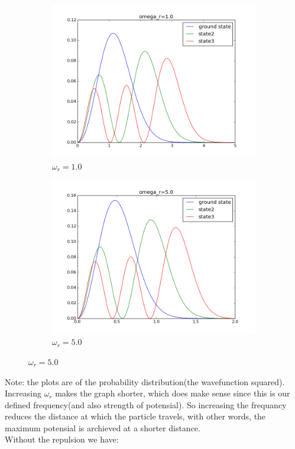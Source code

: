 \documentclass[11pt, a4 paper]{report}
\newenvironment{tabbed}{\begin{addmargin}{0.1cm}}{\end{addmargin}}
\newcommand{\vsp}{\vspace{0.2cm}}
\begin{document}
    \begin{figure}[H] 
        \captionsetup[subfigure]{labelformat=empty}
        \begin{subfigure}[b!]{0.6\textwidth}
            \centering
            \includegraphics[width=\textwidth]{or1.png}
            \caption{$\omega_r=1.0$}
        \end{subfigure}
        \begin{subfigure}[b!]{0.6\textwidth}
            \centering
            \includegraphics[width=\textwidth]{or5.png}
            \caption{$\omega_r=5.0$}
        \end{subfigure}
    \end{figure}
    \begin{tabbed}
    Note: the plots are of the probability distribution(the wavefunction squared).\vsp\\
    Increasing $\omega_r$ makes the graph shorter, which does make sense since this is our defined frequency(and also strength of potensial). So increasing the frequancy reduces the distance at which the particle travels, with other words, the maximum potensial is archieved at a shorter distance.\vsp\\
    Without the repulsion we have:
    \end{tabbed}
\end{document}
